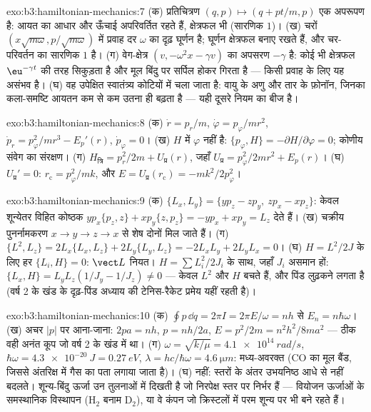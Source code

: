 \begin{solution}{exo:b3:hamiltonian-mechanics:7}
(क) प्रतिचित्रण $(q, p) \mapsto (q + pt/m, p)$ एक अपरूपण है: आयत का
आधार और ऊँचाई अपरिवर्तित रहते हैं, क्षेत्रफल भी (सारणिक $1$)।
(ख) चरों $(x\sqrt{m\omega}, p/\sqrt{m\omega})$ में प्रवाह दर
$\omega$ का दृढ़ घूर्णन है; घूर्णन क्षेत्रफल बनाए रखते हैं, और
चर-परिवर्तन का सारणिक $1$ है। (ग) वेग-क्षेत्र
$(v, -\omega^2x - \gamma v)$ का अपसरण $-\gamma$ है: कोई भी क्षेत्रफल
$\eu^{-\gamma t}$ की तरह सिकुड़ता है और मूल बिंदु पर सर्पिल होकर गिरता
है --- किसी  प्रवाह के लिए यह असंभव है। (घ) वह उपेक्षित
स्वातंत्र्य कोटियों में चला जाता है: वायु के अणु और तार के फ़ोनॉन,
जिनका कला-समष्टि आयतन कम से कम उतना ही बढ़ता है --- यही दूसरे नियम का
बीज है।
\end{solution}

\begin{solution}{exo:b3:hamiltonian-mechanics:8}
(क) $\dot r = p_r/m$, $\dot\varphi = p_\varphi/mr^2$, $\dot p_r =
p_\varphi^2/mr^3 - E_p'(r)$, $\dot p_\varphi = 0$। (ख) $H$ में
$\varphi$ नहीं है: $\{p_\varphi, H\} = -\partial H/\partial\varphi =
0$; कोणीय संवेग का संरक्षण। (ग) $H_{\text{त्रि}} = p_r^2/2m +
U_{\text{प्र}}(r)$, जहाँ $U_{\text{प्र}} = p_\varphi^2/2mr^2 + E_p(r)$।
(घ) $U_{\text{प्र}}' = 0$: $r_{\text{c}} = p_\varphi^2/mk$, और $E =
U_{\text{प्र}}(r_{\text{c}}) = -mk^2/2p_\varphi^2$।
\end{solution}

\begin{solution}{exo:b3:hamiltonian-mechanics:9}
(क) $\{L_x, L_y\} = \{yp_z - zp_y,\ zp_x - xp_z\}$: केवल शून्येतर
विहित कोष्ठक $yp_x\{p_z, z\} + xp_y\{z,
p_z\} = -yp_x + xp_y = L_z$ देते हैं। (ख) चक्रीय पुनर्नामकरण $x \to y \to z \to
x$ से शेष दोनों मिल जाते हैं। (ग) $\{L^2, L_z\} = 2L_x\{L_x, L_z\} +
2L_y\{L_y, L_z\} = -2L_xL_y + 2L_yL_x = 0$। (घ) $H = L^2/2J$ के लिए
हर $\{L_i, H\} = 0$: $\vect L$ नियत। $H = \sum L_i^2/2J_i$ के साथ,
जहाँ $J_i$ असमान हों: $\{L_x, H\} = L_yL_z(1/J_y - 1/J_z) \neq 0$ ---
केवल $L^2$ और $H$ बचते हैं, और पिंड लुढ़कने लगता है (वर्ष 2 के खंड के
दृढ़-पिंड अध्याय की टेनिस-रैकेट प्रमेय यहीं रहती है)।
\end{solution}

\begin{solution}{exo:b3:hamiltonian-mechanics:10}
(क) $\oint p\,\dd q = 2\pi I = 2\pi E/\omega = nh$ से $E_n =
n\hbar\omega$। (ख) अचर $|p|$ पर आना-जाना: $2pa = nh$, $p =
nh/2a$, $E = p^2/2m = n^2h^2/8ma^2$ --- ठीक वही अनंत कूप जो
वर्ष 2 के खंड में था। (ग) $\omega = \sqrt{k/\mu} = \qty{4.1e14}{rad/s}$,
$\hbar\omega = \qty{4.3e-20}{J} = \qty{0.27}{eV}$, $\lambda = hc/
\hbar\omega = \qty{4.6}{\micro m}$: मध्य-अवरक्त (CO का मूल
बैंड, जिससे अंतरिक्ष में गैस का पता लगाया जाता है)। (घ) नहीं: स्तरों के
अंतर उभयनिष्ठ आधे से नहीं बदलते। शून्य-बिंदु ऊर्जा उन तुलनाओं में
दिखती है जो निरपेक्ष स्तर पर निर्भर हैं --- वियोजन ऊर्जाओं के
समस्थानिक विस्थापन (H$_2$ बनाम D$_2$), या वे कंपन जो
क्रिस्टलों में परम शून्य पर भी बने रहते हैं।
\end{solution}

